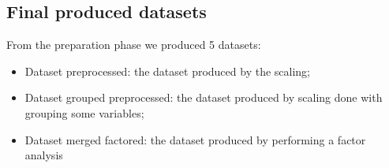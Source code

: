 \subsection{Final produced datasets}

From the preparation phase we produced 5 datasets:

\begin{itemize}
    \item Dataset preprocessed: the dataset produced by the scaling;
    \item Dataset grouped preprocessed: the dataset produced by scaling done with grouping some variables;
    \item Dataset merged factored: the dataset produced by performing a factor analysis
\end{itemize}